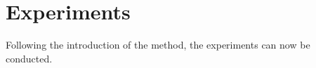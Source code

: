 \chapter{Experiments}

Following the introduction of the method, the experiments can now be conducted. 


